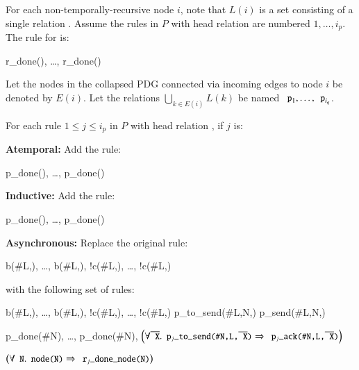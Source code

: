For each non-temporally-recursive node $i$, note that $L(i)$ is a set consisting
of a single relation .  Assume the rules in $P$ with head relation
 are numbered $1, \ldots, i_p$.  The rule for 
is:

\begin{Drules}
        {r_done(), \ldots, r_done()}
\end{Drules}

Let the nodes in the collapsed PDG connected via incoming edges to node $i$ be denoted by $E(i)$.  Let the relations $\bigcup_{k \in E(i)} L(k)$ be named $\dedalus{p}_1, \ldots, \dedalus{p}_{i_q}$.

For each rule $1 \leq j \leq i_p$ in $P$ with head relation , if $j$ is:

\noindent
\textbf{Atemporal:}
Add the rule:

\begin{Drules}
        {p_done(), \ldots, p_done()}
\end{Drules}

\noindent
\textbf{Inductive:}
Add the rule:

\begin{Drules}
        {p_done(), \ldots, p_done()}
\end{Drules}

\noindent
\textbf{Asynchronous:}
Replace the original rule:

\begin{Drules}
        {b(#L,), \ldots, b(#L,), !c(#L,), \ldots, !c(#L,)}
\end{Drules}

with the following set of rules:

\begin{Drules}
      {b(#L,), \ldots, b(#L,), !c(#L,), \ldots, !c(#L,)}
      {p_to_send(#L,N,)}
      {p_send(#L,N,)}

      {p_done(#N), \ldots, p_done(#N), \(\left(\forall \od{X} . \dedalus{p\sub{j}_to_send(#N,L,\od{X})} \Rightarrow \dedalus{p\sub{j}_ack(#N,L,\od{X})}\right)\)}

      {\(\left(\forall \dedalus{N} . \dedalus{node(N)} \Rightarrow \dedalus{r\sub{j}_done_node(N)}\right)\)}
\end{Drules}

